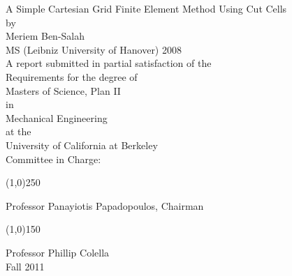 

\begin{titlepage}

\begin{center}
{\Huge A Simple Cartesian Grid Finite Element Method Using Cut Cells}\\
 \vspace{0.5cm}
by\\
 \vspace{0.5cm}
Meriem Ben-Salah\\
 \vspace{0.5cm}
MS (Leibniz University of Hanover) 2008\\ 
 \vspace{1.5cm} 
A report submitted in partial satisfaction of the\\ 
 \vspace{0.5cm}
Requirements for the degree of\\  
 \vspace{0.5cm} 
Masters of Science, Plan II\\  
 \vspace{0.5cm} 
in\\  
 \vspace{0.5cm} 
Mechanical Engineering\\  
 \vspace{0.5cm} 
at the\\  
 \vspace{0.5cm}
University of California at Berkeley\\  
  \vspace{1.5cm}
Committee in Charge: \\ 
 \vspace{0.5cm}
 \begin{center}
\line(1,0){250}
\end{center}
Professor Panayiotis Papadopoulos, Chairman\\  
 \vspace{1.0cm}
 \begin{center}
\line(1,0){150}
\end{center}
Professor Phillip Colella\\  
  \vspace{1.5cm}
Fall 2011\\  
\end{center}




\end{titlepage}
